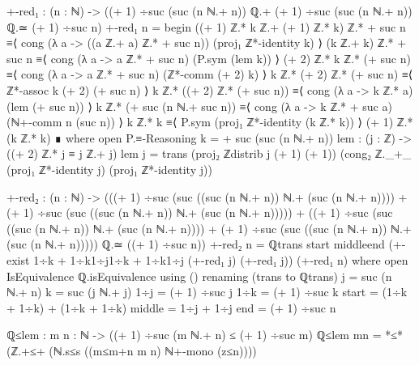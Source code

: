 \documentclass[11pt,a4paper]{article}
\begin{document}
\begin{code}
+-red₁ : (n : ℕ) -> 
  ((+ 1) ÷suc (suc (n ℕ.+ n)) ℚ.+ 
  (+ 1) ÷suc (suc (n ℕ.+ n)) ℚ.≃ (+ 1) ÷suc n)
+-red₁ n = begin 
  ((+ 1) ℤ.* k ℤ.+ (+ 1) ℤ.* k) ℤ.* + suc n 
  ≡⟨ cong (λ a -> ((a ℤ.+ a) ℤ.* + suc n)) (proj₁ ℤ*-identity k) ⟩
  (k ℤ.+ k) ℤ.* + suc n 
  ≡⟨ cong (λ a -> a ℤ.* + suc n) (P.sym (lem k)) ⟩
  (+ 2) ℤ.* k ℤ.* (+ suc n) 
  ≡⟨ cong (λ a -> a ℤ.* + suc n) (ℤ*-comm (+ 2) k) ⟩
  k ℤ.* (+ 2) ℤ.* (+ suc n) 
  ≡⟨ ℤ*-assoc k (+ 2) (+ suc n) ⟩
  k ℤ.* ((+ 2) ℤ.* (+ suc n)) 
  ≡⟨ cong (λ a -> k ℤ.* a) (lem (+ suc n)) ⟩
  k ℤ.* (+ suc (n ℕ.+ suc n)) 
  ≡⟨ cong (λ a -> k ℤ.* + suc a) (ℕ+-comm n (suc n)) ⟩
  k ℤ.* k ≡⟨ P.sym (proj₁ ℤ*-identity (k ℤ.* k)) ⟩
  (+ 1) ℤ.* (k ℤ.* k)
  ∎
    where
      open P.≡-Reasoning
      k = + suc (suc (n ℕ.+ n))
      lem : (j : ℤ) -> ((+ 2) ℤ.* j ≡ j ℤ.+ j)
      lem j = trans (proj₂ ℤdistrib j (+ 1) (+ 1)) 
        (cong₂ ℤ._+_ (proj₁ ℤ*-identity j) (proj₁ ℤ*-identity j)) 

+-red₂ : (n : ℕ) -> 
       (((+ 1) ÷suc (suc ((suc (n ℕ.+ n)) ℕ.+ (suc (n ℕ.+ n)))) +
       (+ 1) ÷suc (suc ((suc (n ℕ.+ n)) ℕ.+ (suc (n ℕ.+ n))))) 
      + 
      ((+ 1) ÷suc (suc ((suc (n ℕ.+ n)) ℕ.+ (suc (n ℕ.+ n)))) +
      (+ 1) ÷suc (suc ((suc (n ℕ.+ n)) ℕ.+ (suc (n ℕ.+ n))))) 
      ℚ.≃ ((+ 1) ÷suc n))
+-red₂ n = ℚtrans {start} {middle}{end} 
  (+-exist {1÷k + 1÷k}{1÷j}{1÷k + 1÷k}{1÷j} (+-red₁ j) (+-red₁ j)) 
    (+-red₁ n)
  where
    open IsEquivalence ℚ.isEquivalence using ()
      renaming (trans to ℚtrans)
    j = suc (n ℕ.+ n)
    k = suc (j ℕ.+ j)
    1÷j = (+ 1) ÷suc j
    1÷k = (+ 1) ÷suc k
    start = (1÷k + 1÷k) + (1÷k + 1÷k)
    middle = 1÷j + 1÷j
    end = (+ 1) ÷suc n

ℚ≤lem : {m n : ℕ} -> ((+ 1) ÷suc (m ℕ.+ n) ≤ (+ 1) ÷suc m)
ℚ≤lem {m}{n} =  *≤* (ℤ.+≤+ (ℕ.s≤s ((m≤m+n m n) ℕ+-mono (z≤n))))


\end{code}
\end{document}
